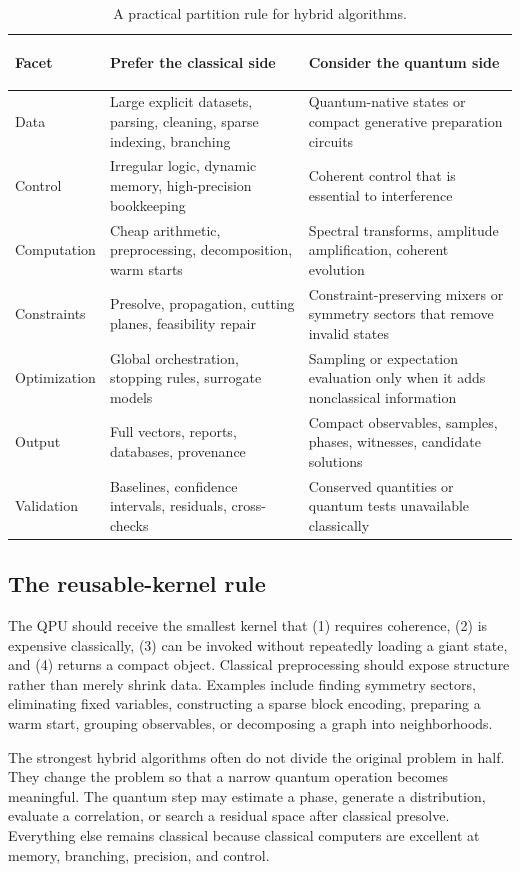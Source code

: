 \begin{table}[htbp]
\centering
\small
\caption{A practical partition rule for hybrid algorithms.}
\label{tab:hybrid}
\begin{tabularx}{\textwidth}{>{\bfseries\raggedright\arraybackslash}p{} X X}
\toprule
Facet & Prefer the classical side & Consider the quantum side\\
\midrule
Data & Large explicit datasets, parsing, cleaning, sparse indexing, branching & Quantum-native states or compact generative preparation circuits\\
Control & Irregular logic, dynamic memory, high-precision bookkeeping & Coherent control that is essential to interference\\
Computation & Cheap arithmetic, preprocessing, decomposition, warm starts & Spectral transforms, amplitude amplification, coherent evolution\\
Constraints & Presolve, propagation, cutting planes, feasibility repair & Constraint-preserving mixers or symmetry sectors that remove invalid states\\
Optimization & Global orchestration, stopping rules, surrogate models & Sampling or expectation evaluation only when it adds nonclassical information\\
Output & Full vectors, reports, databases, provenance & Compact observables, samples, phases, witnesses, candidate solutions\\
Validation & Baselines, confidence intervals, residuals, cross-checks & Conserved quantities or quantum tests unavailable classically\\
\bottomrule
\end{tabularx}
\end{table}

\subsection{The reusable-kernel rule}

The QPU should receive the smallest kernel that (1) requires coherence, (2) is expensive classically, (3) can be invoked without repeatedly loading a giant state, and (4) returns a compact object. Classical preprocessing should expose structure rather than merely shrink data. Examples include finding symmetry sectors, eliminating fixed variables, constructing a sparse block encoding, preparing a warm start, grouping observables, or decomposing a graph into neighborhoods.

The strongest hybrid algorithms often do not divide the original problem in half. They change the problem so that a narrow quantum operation becomes meaningful. The quantum step may estimate a phase, generate a distribution, evaluate a correlation, or search a residual space after classical presolve. Everything else remains classical because classical computers are excellent at memory, branching, precision, and control.


